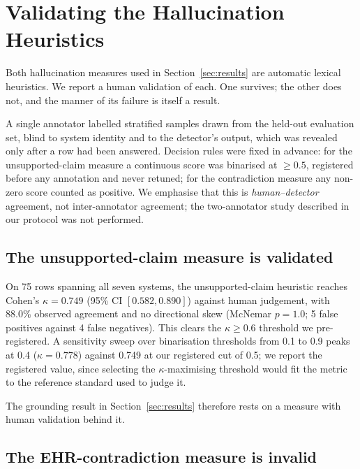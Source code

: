 
\section{Validating the Hallucination Heuristics}
\label{sec:halluc-validation}

Both hallucination measures used in Section~\ref{sec:results} are automatic
lexical heuristics. We report a human validation of each. One survives; the
other does not, and the manner of its failure is itself a result.

A single annotator labelled stratified samples drawn from the held-out
evaluation set, blind to system identity and to the detector's output, which
was revealed only after a row had been answered. Decision rules were fixed in
advance: for the unsupported-claim measure a continuous score was binarised at
$\geq 0.5$, registered before any annotation and never retuned; for the
contradiction measure any non-zero score counted as positive. We emphasise that
this is \emph{human--detector} agreement, not inter-annotator agreement; the
two-annotator study described in our protocol was not performed.

\subsection{The unsupported-claim measure is validated}

On 75 rows spanning all seven systems, the unsupported-claim heuristic reaches
Cohen's $\kappa = 0.749$ (95\% CI $[0.582, 0.890]$) against human judgement,
with 88.0\% observed agreement and no directional skew (McNemar $p = 1.0$;
5 false positives against 4 false negatives). This clears the $\kappa \geq 0.6$
threshold we pre-registered. A sensitivity sweep over binarisation thresholds
from 0.1 to 0.9 peaks at 0.4 ($\kappa = 0.778$) against 0.749 at our registered
cut of 0.5; we report the registered value, since selecting the
$\kappa$-maximising threshold would fit the metric to the reference standard
used to judge it.

The grounding result in Section~\ref{sec:results} therefore rests on a measure
with human validation behind it.

\subsection{The EHR-contradiction measure is invalid}

